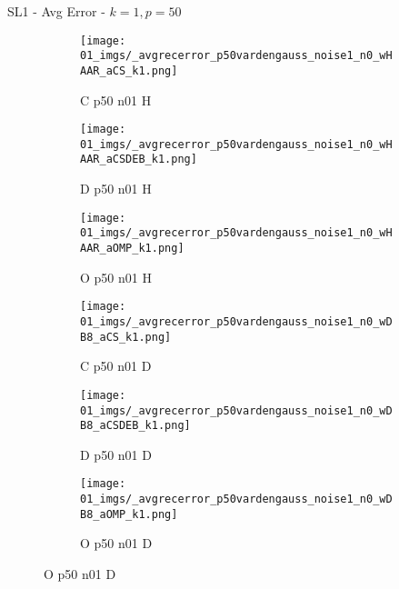 \begin{frame}{SL1 - Avg Error - $k=1,p=50$}{}
\begin{figure}
\begin{subfigure}{0.13\textwidth}
\texttt{[image: 01\_imgs/\_avgrecerror\_p50vardengauss\_noise1\_n0\_wHAAR\_aCS\_k1.png]}
\caption*{\tiny C p50 n01 H}
\end{subfigure}
\begin{subfigure}{0.13\textwidth}
\texttt{[image: 01\_imgs/\_avgrecerror\_p50vardengauss\_noise1\_n0\_wHAAR\_aCSDEB\_k1.png]}
\caption*{\tiny D p50 n01 H}
\end{subfigure}
\begin{subfigure}{0.13\textwidth}
\texttt{[image: 01\_imgs/\_avgrecerror\_p50vardengauss\_noise1\_n0\_wHAAR\_aOMP\_k1.png]}
\caption*{\tiny O p50 n01 H}
\end{subfigure}
\begin{subfigure}{0.13\textwidth}
\texttt{[image: 01\_imgs/\_avgrecerror\_p50vardengauss\_noise1\_n0\_wDB8\_aCS\_k1.png]}
\caption*{\tiny C p50 n01 D}
\end{subfigure}
\begin{subfigure}{0.13\textwidth}
\texttt{[image: 01\_imgs/\_avgrecerror\_p50vardengauss\_noise1\_n0\_wDB8\_aCSDEB\_k1.png]}
\caption*{\tiny D p50 n01 D}
\end{subfigure}
\begin{subfigure}{0.13\textwidth}
\texttt{[image: 01\_imgs/\_avgrecerror\_p50vardengauss\_noise1\_n0\_wDB8\_aOMP\_k1.png]}
\caption*{\tiny O p50 n01 D}
\end{subfigure}

\vspace{5pt}


\end{figure}
\end{frame}
